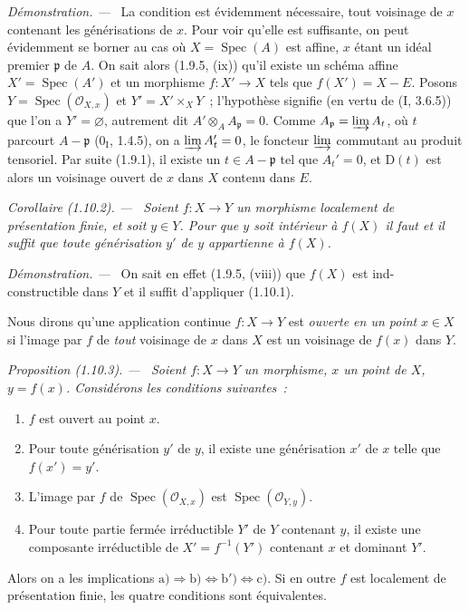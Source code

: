 \documentclass[10pt,oneside]{book}
\makeatletter
\newcommand{\setmanualcurrentlabel}[1]{\def\@currentlabel{#1}}
\newenvironment{proposition}[1][]{%
  \setmanualcurrentlabel{#1}\par\medskip\noindent\itshape Proposition (#1). ---\ }{\par}
\newenvironment{corollary}[1][]{%
  \setmanualcurrentlabel{#1}\par\medskip\noindent\itshape Corollaire (#1). ---\ }{\par}
\newenvironment{proof}{%
  \par\medskip\noindent\textit{Démonstration. ---\ }}{\par}
\newcommand{\EGAReaderTarget}[2]{\hypertarget{#1}{}\@bsphack\begingroup\def\@currentHref{#1}\label{#2}\endgroup\@esphack}
\makeatother
\begin{document}
\begin{proof}
La condition est évidemment nécessaire, tout voisinage de $x$ contenant les
générisations de $x$. Pour voir qu'elle est suffisante, on peut évidemment se
borner au cas où $X=\operatorname{Spec}(A)$ est affine, $x$ étant un idéal premier
$\mathfrak p$ de $A$. On sait alors (1.9.5, (ix)) qu'il existe un schéma affine
$X'=\operatorname{Spec}(A')$ et un morphisme $f:X'\to X$ tels que
$f(X')=X-E$. Posons $Y=\operatorname{Spec}(\mathcal O_{X,x})$ et
$Y'=X'\times_XY$~; l'hypothèse signifie (en
vertu de (I, 3.6.5)) que l'on a $Y'=\varnothing$, autrement dit
$A'\otimes_AA_{\mathfrak p}=0$. Comme
$A_{\mathfrak p}=\varinjlim A_t$, où $t$ parcourt $A-\mathfrak p$
($0_{\mathrm I}$, 1.4.5), on a $\varinjlim A_t'=0$, le foncteur
$\varinjlim$ commutant au produit tensoriel. Par suite (1.9.1), il existe un
$t\in A-\mathfrak p$ tel que $A_t'=0$, et $\mathrm D(t)$ est alors un
voisinage ouvert de $x$ dans $X$ contenu dans $E$.
\end{proof}

\begin{corollary}[1.10.2]
\label{IV.1.10.2-fr}
Soient $f:X\to Y$ un morphisme localement de présentation finie, et soit
$y\in Y$. Pour que $y$ soit intérieur à $f(X)$ il faut et il suffit que toute
générisation $y'$ de $y$ appartienne à $f(X)$.
\end{corollary}

\begin{proof}
On sait en effet (1.9.5, (viii)) que $f(X)$ est ind-constructible dans $Y$ et
il suffit d'appliquer (1.10.1).
\end{proof}

Nous dirons qu'une application continue $f:X\to Y$ est \emph{ouverte en un
point} $x\in X$ si l'image par $f$ de \emph{tout} voisinage de $x$ dans $X$
est un voisinage de $f(x)$ dans $Y$.

\begin{proposition}[1.10.3]
\EGAReaderTarget{ega4.c04.prop.1-10-3}{IV.1.10.3-fr}
Soient $f:X\to Y$ un morphisme, $x$ un point de $X$, $y=f(x)$. Considérons
les conditions suivantes~:
\begin{enumerate}
  \item[a)] $f$ est ouvert au point $x$.
  \item[b)] Pour toute générisation $y'$ de $y$, il existe une générisation
  $x'$ de $x$ telle que $f(x')=y'$.
  \item[b')] L'image par $f$ de $\operatorname{Spec}(\mathcal O_{X,x})$ est
  $\operatorname{Spec}(\mathcal O_{Y,y})$.
  \item[c)] Pour toute partie fermée irréductible $Y'$ de $Y$ contenant $y$,
  il existe une composante irréductible de $X'=f^{-1}(Y')$ contenant $x$ et
  dominant $Y'$.
\end{enumerate}
Alors on a les implications
$\mathrm{a)}\Rightarrow\mathrm{b)}\Leftrightarrow\mathrm{b')}
\Leftrightarrow\mathrm{c)}$. Si en outre $f$ est localement de présentation
finie, les quatre conditions sont équivalentes.
\end{proposition}
\end{document}
